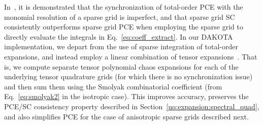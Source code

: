 In~\cite{Eld09a}, it is demonstrated that the synchronization of
total-order PCE with the monomial resolution of a sparse grid is
imperfect, and that sparse grid SC consistently outperforms sparse
grid PCE when employing the sparse grid to directly evaluate the
integrals in Eq.~\ref{eq:coeff_extract}.  In our DAKOTA implementation, we 
depart from the use of sparse integration of total-order expansions, and 
instead employ a linear combination of tensor expansions~\cite{ConstSSG}.
That is, we compute separate tensor polynomial chaos expansions for
each of the underlying tensor quadrature grids (for which there is no
synchronization issue) and then sum them using the Smolyak
combinatorial coefficient (from Eq.~\ref{eq:smolyak2} in the isotropic
case).  This improves accuracy, preserves the PCE/SC consistency
property described in Section~\ref{uq:expansion:spectral_quad}, and also
simplifies PCE for the case of anisotropic sparse grids described next.

